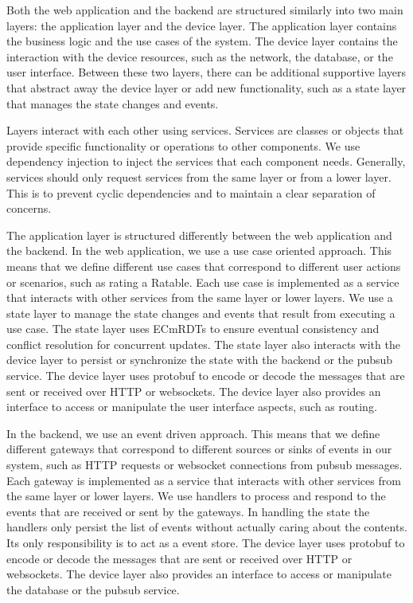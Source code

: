 \documentclass[
	ngerman,
	ruledheaders=section,   %
	class=report,		    %
	thesis={type=bachelor}, %
	accentcolor=9c,			%
	custommargins=true,    %
	marginpar=false,        %
	parskip=half-,          %
	fontsize=11pt,          %
]{tudapub}
\begin{document}
Both the web application and the backend are structured similarly into two main layers: the application layer and the device layer. The application layer contains the business logic and the use cases of the system. The device layer contains the interaction with the device resources, such as the network, the database, or the user interface. Between these two layers, there can be additional supportive layers that abstract away the device layer or add new functionality, such as a state layer that manages the state changes and events.

Layers interact with each other using services. Services are classes or objects that provide specific functionality or operations to other components. We use dependency injection to inject the services that each component needs. Generally, services should only request services from the same layer or from a lower layer. This is to prevent cyclic dependencies and to maintain a clear separation of concerns.

The application layer is structured differently between the web application and the backend. In the web application, we use a use case oriented approach. This means that we define different use cases that correspond to different user actions or scenarios, such as rating a Ratable. Each use case is implemented as a service that interacts with other services from the same layer or lower layers. We use a state layer to manage the state changes and events that result from executing a use case. The state layer uses ECmRDTs to ensure eventual consistency and conflict resolution for concurrent updates. The state layer also interacts with the device layer to persist or synchronize the state with the backend or the pubsub service. The device layer uses protobuf to encode or decode the messages that are sent or received over HTTP or websockets. The device layer also provides an interface to access or manipulate the user interface aspects, such as routing.

In the backend, we use an event driven approach. This means that we define different gateways that correspond to different sources or sinks of events in our system, such as HTTP requests or websocket connections from pubsub messages. Each gateway is implemented as a service that interacts with other services from the same layer or lower layers. We use handlers to process and respond to the events that are received or sent by the gateways. In handling the state the handlers only persist the list of events without actually caring about the contents. Its only responsibility is to act as a event store. The device layer uses protobuf to encode or decode the messages that are sent or received over HTTP or websockets. The device layer also provides an interface to access or manipulate the database or the pubsub service.
\end{document}

